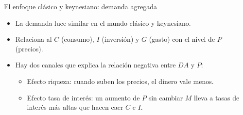 \documentclass{beamer}
\begin{document}
\begin{frame}{El enfoque clásico y keynesiano: demanda agregada}
    \begin{itemize}
    \item La demanda luce similar en el mundo clásico y keynesiano.
    \item Relaciona al $C$ (consumo), $I$ (inversión) y $G$ (gasto) con el nivel de $P$ (precios). 
    \end{itemize}
\vspace{-5mm}
\begin{center}
    \begin{figure}[H]
    \begin{center}
    \end{center}
    \end{figure}
\end{center}
\vspace{-3mm}
    \begin{itemize}
    \item Hay dos canales que explica la relación negativa entre $DA$ y $P$:
        \begin{itemize}
            \item Efecto riqueza: cuando suben los precios, el dinero vale menos. 
            \item Efecto tasa de interés: un aumento de $P$ sin cambiar $M$ lleva a tasas de interés más altas que hacen caer $C$ e $I$.
        \end{itemize}
    \end{itemize}

\end{frame}
\end{document}
